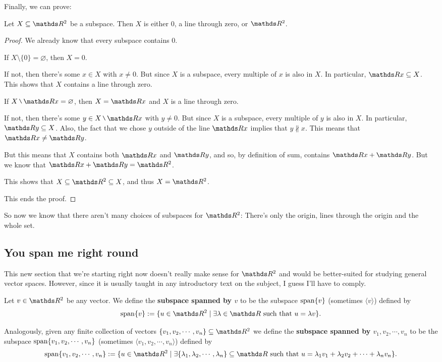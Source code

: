 Finally, we can prove:

\begin{theorem}
	Let $X\subseteq \R^2$ be a subspace. Then $X$ is either 0, a line through zero, or $\R^2$.
\end{theorem}
\begin{proof}
	We already know that every subspace contains 0.
	
	If $X\setminus\{0\}=\varnothing$, then $X=0$.
	
	\bigskip
	If not, then there's some $x\in X$ with $x\neq 0$. But since $X$ is a subspace, every multiple of $x$ is also in $X$. In particular, $\R x\subseteq X$. This shows that $X$ contains a line through zero.
	
	If $X\setminus\R x=\varnothing$, then $X=\R x$ and $X$ is a line through zero.
	
	\bigskip
	If not, then there's some $y\in X\setminus\R x$ with $y\neq 0$. But since $X$ is a subspace, every multiple of $y$ is also in $X$. In particular, $\R y\subseteq X$. Also, the fact that we chose $y$ outside of the line $\R x$ implies that $y\nparallel x$. This means that $\R x\neq\R y$.
	
	But this means that $X$ contains both $\R x$ and $\R y$, and so, by definition of sum, contains $\R x+\R y$. But we know that $\R x+\R y=\R^2$.
	
	This shows that $X\subseteq \R^2\subseteq X$, and thus $X=\R^2$.
	
	This ends the proof.
\end{proof}

So now we know that there aren't many choices of subspaces for $\R^2$: There's only the origin, lines through the origin and the whole set.

\newpage
\subsection{You span me right round}

This new section that we're starting right now doesn't really make sense for $\R^2$ and would be better-suited for studying general vector spaces. However, since it is usually taught in any introductory text on the subject, I guess I'll have to comply.

\begin{df}
	Let $v\in \R^2$ be any vector. We define the \textbf{subspace spanned by $v$} to be the subspace $\operatorname{span} \{v\}$ (sometimes $\langle v\rangle$) defined by
	\[\spen\{v\}:=\{u\in \R^2\mid \exists\lambda\in \R \mbox{ such that } u=\lambda v\}.\]
	
	Analogously, given any finite collection of vectors $\{v_1,v_2,\cdots,v_n\}\subseteq \R^2$ we define the \textbf{subspace spanned by $v_1,v_2,\cdots,v_n$} to be the subspace $\operatorname{span}\{v_1,v_2,\cdots,v_n\}$ (sometimes $\langle v_1,v_2,\cdots,v_n\rangle$) defined by
	\[\spen\{v_1,v_2,\cdots,v_n\}:=\{u\in \R^2\mid \exists\{\lambda_1,\lambda_2,\cdots,\lambda_n\}\subseteq\R \mbox{ such that }u=\lambda_1v_1+\lambda_2v_2+\cdots+\lambda_nv_n\}.\]
\end{df}

